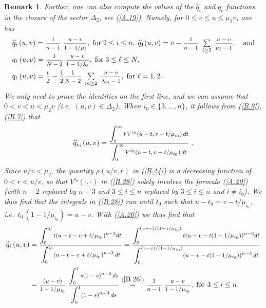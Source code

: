 \documentclass[12pt,leqno]{article}
\def\dis{\displaystyle}
\def\f{\footnotesize}
\def\wh{\widehat}
\newtheorem{remark}[theorem]{Remark}
\begin{document}
\begin{appendix}
\begin{remark}
\medskip
Further, one can also compute the values of the $\wh{q}_i$ and $q_\ell$ functions in the closure of the sector $\Delta_2$, see (\ref{A.19}). Namely, for $0 \le v \le u \le \mu_2 v$, one has 
\begin{equation}\label{B.27}
\begin{array}{l}
\wh{q}_i \,(u,v) = \mbox{\f $\dis\frac{1}{n-1}$} \; \mbox{\f $\dis\frac{u-v}{1 - 1/\mu_i}$}, \;\mbox{for} \; 2 \le i \le n, \; \wh{q}_1 (u,v) = v - \mbox{\f $\dis\frac{1}{n-1}$} \; \sum\limits_{i \ge 2} \; \mbox{\f $\dis\frac{u-v}{\mu_i - 1}$}, \quad \mbox{and}
\\[2ex]
q_\ell \,(u,v) = \mbox{\f $\dis\frac{1}{N-2}$} \; \mbox{\f $\dis\frac{u-v}{1 - 1/\lambda_\ell}$}, \;\mbox{for} \; 3 \le \ell \le N, 
\\[2ex]
q_\ell\,(u,v) = \mbox{\f $\dis\frac{v}{2}$}  - \mbox{\f $\dis\frac{1}{2} \dis\frac{1}{N-2}$} \; \sum\limits_{m \ge 2} \; \mbox{\f $\dis\frac{u-v}{\lambda_m - 1}$}, \; \mbox{for $\ell = 1,2$}.
\end{array}
\end{equation}
We only need to prove the identities on the first line, and we can assume that $0 < v < u < \mu_2 v$ (i.e.~$(u,v) \in \Delta_2$). When $i_0 \in \{3, \dots, n\}$, it follows from (\ref{B.9}), (\ref{B.7}) that
\begin{equation}\label{B.28}
\wh{q}_{i_0}\, (u,v) = \mbox{\f $\dis\frac{\dis\int^\infty_0 t \,V^{i_0} (u-t, v-t/\mu_{i_0})\, dt}{\dis\int^\infty_0 V^{i_0} (u-t, v-t/\mu_{i_0})\, dt}$} \;.
\end{equation}
Since $u/v < \mu_2$, the quantity $\rho(u/v,r)$ in (\ref{B.14}) is a decreasing function of $0 < r < u/v$, so that $V^{i_0}(\cdot,\cdot)$ in (\ref{B.28}) solely involves the formula (\ref{A.20}) (with $n-2$ replaced by $n-3$ and $3 \le i \le n$ replaced by $3 \le i \le n$ and $i \not= i_0$). We thus find that the integrals in (\ref{B.28}) run until $t_0$ such that $u - t_0 = v - t/\mu_{i_0}$, i.e.~$t_0\,(1 - 1/\mu_{i_0}) = u-v$. With (\ref{A.20}) we thus find that
\begin{equation}\label{B.29}
\begin{split}
\wh{q}_i \,(u,v) & = \mbox{\f $\dis\frac{\dis\int^{t_0}_0 t(u-t - v + t/\mu_{i_0})^{n-3} dt}{\dis\int^{t_0}_0 (u-t-v+t/\mu_{i_0})^{n-3} \,dt}$} =  \mbox{\f $\dis\frac{\dis\int^{(u-v)/(1-1/\mu_{i_0})}_0 t(u-v-t(1-1/\mu_{i_0}))^{n-3} dt}{\dis\int^{(u-v)/(1-1/\mu_{i_0})}_0 (u-v-t(1-1/\mu_{i_0}))^{n-3} \,dt}$} 
\\
& =  \mbox{\f $\dis\frac{(u-v)}{1-1/\mu_{i_0}}$} \;  \mbox{\f $\dis\frac{\dis\int^1_0 s(1-s)^{n-3} \, ds}{\dis\int^1_0 (1-s)^{n-3} \, ds}$} \stackrel{{\rm (\ref{B.26})}}{=} \mbox{\f $\dis\frac{1}{n-1}$} \;  \mbox{\f $\dis\frac{u-v}{1-1/\mu_{i_0}}$}, \; \mbox{for $3 \le i \le n$}.

\end{split}
\end{equation}
\end{remark}
\end{appendix}
\end{document}
